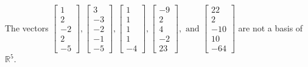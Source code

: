 \begin{exercise}
\begin{exerciseStatement}
  \end{exerciseStatement}
  \begin{exerciseAnswer}
   The vectors \(\left[\begin{array}{r}
1 \\
2 \\
-2 \\
2 \\
-5
\end{array}\right] , \left[\begin{array}{r}
3 \\
-3 \\
-2 \\
-1 \\
-5
\end{array}\right] , \left[\begin{array}{r}
1 \\
1 \\
1 \\
1 \\
-4
\end{array}\right] , \left[\begin{array}{r}
-9 \\
2 \\
4 \\
-2 \\
23
\end{array}\right] , \text{ and } \left[\begin{array}{r}
22 \\
2 \\
-10 \\
10 \\
-64
\end{array}\right]\) 
  	 are not  a basis of \(\mathbb{R}^5\).
  


  \end{exerciseAnswer}
\end{exercise}